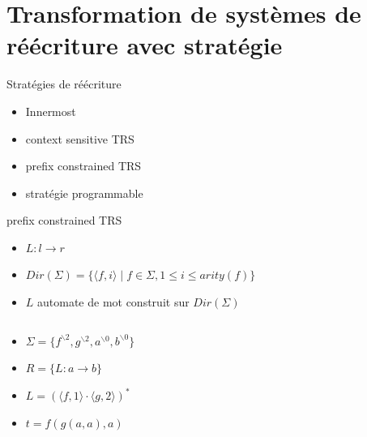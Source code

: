 \documentclass[xcolor={dvipsnames}]{beamer}
\begin{document}
\section{Transformation de systèmes de réécriture avec stratégie}

\begin{frame}{Stratégies de réécriture}
  \begin{itemize}
  \item Innermost
  \item context sensitive TRS
  \item prefix constrained TRS
  \item stratégie programmable
  \end{itemize}
\end{frame}

\begin{frame}{prefix constrained TRS}
  \begin{itemize}
  \item $L : l \rightarrow r$
  \item $Dir(\Sigma) = \{\langle f, i \rangle \mid f \in \Sigma, 1 \leq i \leq arity(f)\}$
  \item $L$ automate de mot construit sur $Dir(\Sigma)$
  \end{itemize}
  \begin{example}
    \begin{columns}
      \begin{column}{0.5\textwidth}
        \begin{itemize}
        \item $\Sigma = \{f^{\backslash 2}, g^{\backslash 2}, a^{\backslash 0}, b^{\backslash 0}\}$
        \item $R = \{L : a \rightarrow b\}$
        \item $L  = (\langle f,1 \rangle \cdot \langle g, 2 \rangle)^*$
        \item $t = f(g(a,a),a)$
        \end{itemize}
      \end{column}
      \begin{column}{0.5\textwidth}
        \begin{overprint}

\end{overprint}
\end{column}
\end{columns}
\end{example}
\end{frame}
\end{document}
